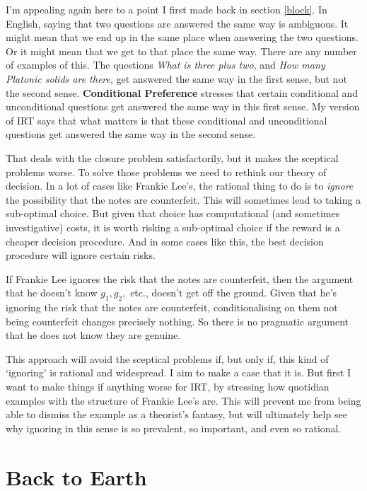 \documentclass[11pt,]{book}
\begin{document}
I'm appealing again here to a point I first made back in section \ref{block}. In English, saying that two questions are answered the same way is ambiguous. It might mean that we end up in the same place when answering the two questions. Or it might mean that we get to that place the same way. There are any number of examples of this. The questions \emph{What is three plus two}, and \emph{How many Platonic solids are there}, get answered the same way in the first sense, but not the second sense. \textbf{Conditional Preference} stresses that certain conditional and unconditional questions get answered the same way in this first sense. My version of IRT says that what matters is that these conditional and unconditional questions get answered the same way in the second sense.

That deals with the closure problem satisfactorily, but it makes the sceptical problems worse. To solve those problems we need to rethink our theory of decision. In a lot of cases like Frankie Lee's, the rational thing to do is to \emph{ignore} the possibility that the notes are counterfeit. This will sometimes lead to taking a sub-optimal choice. But given that choice has computational (and sometimes investigative) costs, it is worth risking a sub-optimal choice if the reward is a cheaper decision procedure. And in some cases like this, the best decision procedure will ignore certain risks.

If Frankie Lee ignores the risk that the notes are counterfeit, then the argument that he doesn't know \(g_1, g_2,\) etc., doesn't get off the ground. Given that he's ignoring the risk that the notes are counterfeit, conditionalising on them not being counterfeit changes precisely nothing. So there is no pragmatic argument that he does not know they are genuine.

This approach will avoid the sceptical problems if, but only if, this kind of `ignoring' is rational and widespread. I aim to make a case that it is. But first I want to make things if anything worse for IRT, by stressing how quotidian examples with the structure of Frankie Lee's are. This will prevent me from being able to dismiss the example as a theorist's fantasy, but will ultimately help see why ignoring in this sense is so prevalent, so important, and even so rational.

\hypertarget{backearth}{%
\section{Back to Earth}\label{backearth}}
\end{document}
